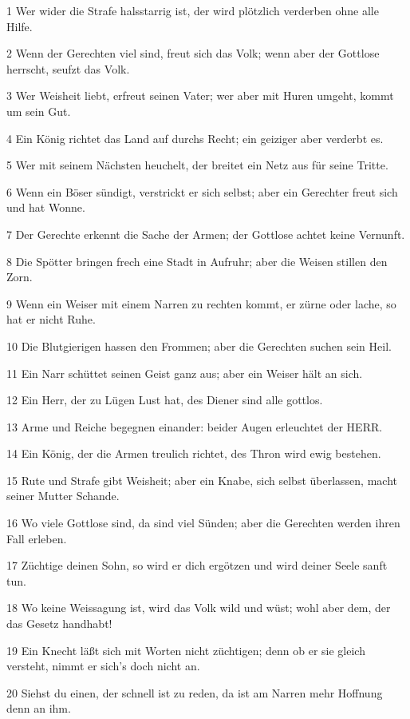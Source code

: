 \par 1 Wer wider die Strafe halsstarrig ist, der wird plötzlich verderben ohne alle Hilfe.
\par 2 Wenn der Gerechten viel sind, freut sich das Volk; wenn aber der Gottlose herrscht, seufzt das Volk.
\par 3 Wer Weisheit liebt, erfreut seinen Vater; wer aber mit Huren umgeht, kommt um sein Gut.
\par 4 Ein König richtet das Land auf durchs Recht; ein geiziger aber verderbt es.
\par 5 Wer mit seinem Nächsten heuchelt, der breitet ein Netz aus für seine Tritte.
\par 6 Wenn ein Böser sündigt, verstrickt er sich selbst; aber ein Gerechter freut sich und hat Wonne.
\par 7 Der Gerechte erkennt die Sache der Armen; der Gottlose achtet keine Vernunft.
\par 8 Die Spötter bringen frech eine Stadt in Aufruhr; aber die Weisen stillen den Zorn.
\par 9 Wenn ein Weiser mit einem Narren zu rechten kommt, er zürne oder lache, so hat er nicht Ruhe.
\par 10 Die Blutgierigen hassen den Frommen; aber die Gerechten suchen sein Heil.
\par 11 Ein Narr schüttet seinen Geist ganz aus; aber ein Weiser hält an sich.
\par 12 Ein Herr, der zu Lügen Lust hat, des Diener sind alle gottlos.
\par 13 Arme und Reiche begegnen einander: beider Augen erleuchtet der HERR.
\par 14 Ein König, der die Armen treulich richtet, des Thron wird ewig bestehen.
\par 15 Rute und Strafe gibt Weisheit; aber ein Knabe, sich selbst überlassen, macht seiner Mutter Schande.
\par 16 Wo viele Gottlose sind, da sind viel Sünden; aber die Gerechten werden ihren Fall erleben.
\par 17 Züchtige deinen Sohn, so wird er dich ergötzen und wird deiner Seele sanft tun.
\par 18 Wo keine Weissagung ist, wird das Volk wild und wüst; wohl aber dem, der das Gesetz handhabt!
\par 19 Ein Knecht läßt sich mit Worten nicht züchtigen; denn ob er sie gleich versteht, nimmt er sich's doch nicht an.
\par 20 Siehst du einen, der schnell ist zu reden, da ist am Narren mehr Hoffnung denn an ihm.
